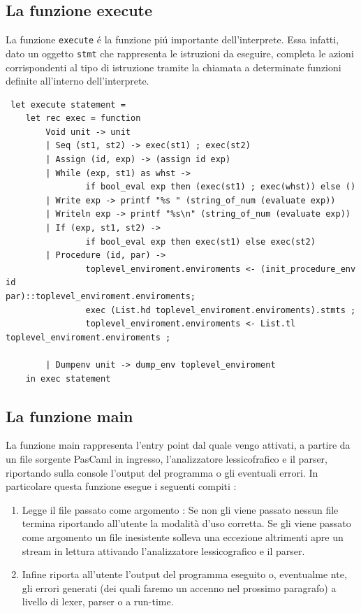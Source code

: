 \documentclass[a4paper,10pt]{article}
\begin{document}
\subsection{La funzione execute}
La funzione \texttt{execute} \'e la funzione pi\'u importante dell'interprete.
Essa infatti, dato un oggetto \texttt{stmt} che rappresenta le istruzioni da
eseguire, completa le azioni corrispondenti al tipo di istruzione tramite la
chiamata a determinate funzioni definite all'interno dell'interprete.
\begin{verbatim}
 let execute statement =
    let rec exec = function
        Void unit -> unit
        | Seq (st1, st2) -> exec(st1) ; exec(st2)
        | Assign (id, exp) -> (assign id exp)
        | While (exp, st1) as whst ->
                if bool_eval exp then (exec(st1) ; exec(whst)) else ()
        | Write exp -> printf "%s " (string_of_num (evaluate exp))
        | Writeln exp -> printf "%s\n" (string_of_num (evaluate exp))
        | If (exp, st1, st2) ->
                if bool_eval exp then exec(st1) else exec(st2)
        | Procedure (id, par) ->
                toplevel_enviroment.enviroments <- (init_procedure_env id
par)::toplevel_enviroment.enviroments;
                exec (List.hd toplevel_enviroment.enviroments).stmts ;
                toplevel_enviroment.enviroments <- List.tl
toplevel_enviroment.enviroments ;

        | Dumpenv unit -> dump_env toplevel_enviroment
    in exec statement

\end{verbatim}

\subsection{La funzione main}
La funzione main rappresenta l'entry point dal quale vengo attivati, a partire
da un file sorgente PasCaml in ingresso, l'analizzatore lessicofrafico e il
parser, riportando sulla console l'output del programma o gli eventuali errori.
In particolare questa funzione esegue i seguenti compiti :
\begin{enumerate}
 \item Legge il file passato come argomento :
 \subitem Se non gli viene passato nessun file termina riportando all'utente la
modalit\`a d'uso corretta.
 \subitem Se gli viene passato come argomento un file inesistente solleva
una eccezione altrimenti apre un stream in lettura attivando l'analizzatore
lessicografico e il parser. 

 \item Infine riporta all'utente l'output del programma eseguito o, eventualme
nte, gli errori generati (dei quali faremo un accenno nel prossimo paragrafo) a
livello di lexer, parser o a run-time.
\end{enumerate}
\end{document}
